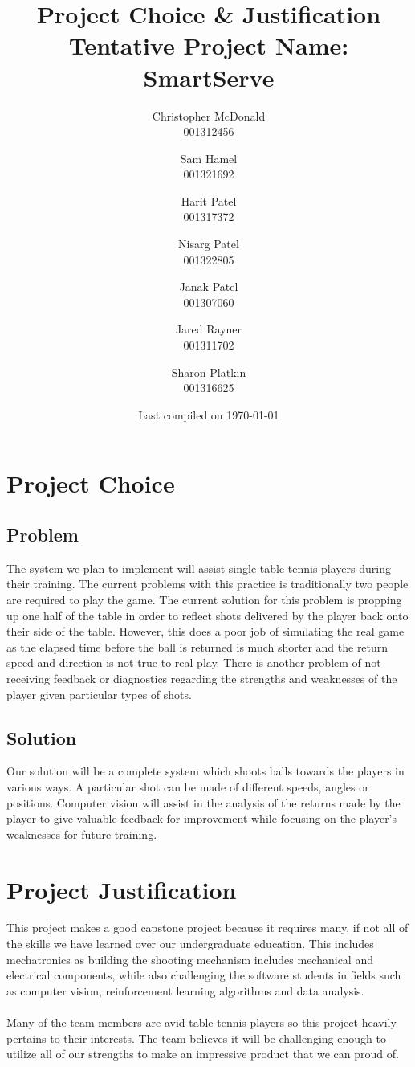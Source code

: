 \documentclass[11pt, oneside]{article}
\title{Project Choice \& Justification \\ Tentative Project Name: SmartServe}
\author{
Christopher McDonald \\ 001312456 \\ \and
Sam Hamel \\ 001321692 \\ \and
Harit Patel \\ 001317372 \\ \and
Nisarg Patel \\ 001322805 \\ \and
Janak Patel \\ 001307060 \\ \and
Jared Rayner \\ 001311702 \\ \and
Sharon Platkin \\ 001316625 \\
}
\date{Last compiled on \today}
\begin{document}
\maketitle
\section*{Project Choice}
\subsection*{Problem}
The system we plan to implement will assist single table tennis players during their training. The current problems with this practice is traditionally two people are required to play the game. The current solution for this problem is propping up one half of the table in order to reflect shots delivered by the player back onto their side of the table. However, this does a poor job of simulating the real game as the elapsed time before the ball is returned is much shorter and the return speed and direction is not true to real play. There is another problem of not receiving feedback or diagnostics regarding the strengths and weaknesses of the player given particular types of shots.
\subsection*{Solution}
Our solution will be a complete system which shoots balls towards the players in various ways. A particular shot can be made of different speeds, angles or positions. Computer vision will assist in the analysis of the returns made by the player to give valuable feedback for improvement while focusing on the player's weaknesses for future training.
\section*{Project Justification}
This project makes a good capstone project because it requires many, if not all of the skills we have learned over our undergraduate education. This includes mechatronics as building the shooting mechanism includes mechanical and electrical components, while also challenging the software students in fields such as computer vision, reinforcement learning algorithms and data analysis. \\ \\
Many of the team members are avid table tennis players so this project heavily pertains to their interests. The team believes it will be challenging enough to utilize all of our strengths to make an impressive product that we can proud of. 
\end{document}

